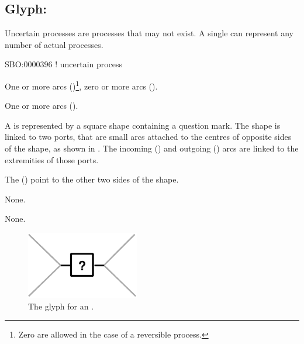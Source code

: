 \subsection{Glyph: }
\label{sec:uncertain}

Uncertain processes are processes that may not exist. A single  can represent any number of actual processes.

\begin{glyphDescription}

\glyphSboTerm
SBO:0000396 ! uncertain process

\glyphIncoming
One or more  arcs ()\footnote{Zero  are allowed in the case of a reversible process.}, zero or more  arcs ().

\glyphOutgoing
One or more  arcs ().

\glyphContainer
A  is represented by a square shape containing a question mark.
The shape is linked to two ports, that are small arcs attached to the centres of opposite sides of the shape, as shown in .
The incoming  () and outgoing  () arcs are linked to the extremities of those ports.

The  () point to the other two sides of the shape.

\glyphLabel
None.

\glyphAux
None.

\end{glyphDescription}

\begin{figure}[H]
  \centering
  \includegraphics{images/build/uncertain.pdf}
  \caption{The \PD glyph for an .}
  \label{fig:uncertain}
\end{figure}

